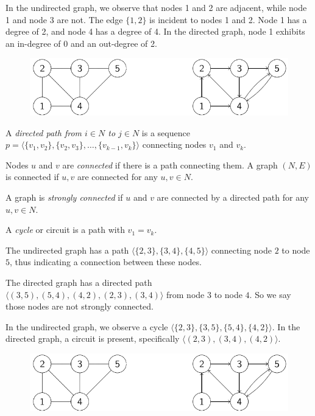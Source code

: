 \begin{example}
    In the undirected graph, we observe that nodes 1 and 2 are adjacent, while node 1 and node 3 are not. 
    The edge $\{1,2\}$ is incident to nodes 1 and 2. 
    Node 1 has a degree of 2, and node 4 has a degree of 4.
    In the directed graph, node 1 exhibits an in-degree of 0 and an out-degree of 2.
    \begin{figure}[H]
        \centering
        \includegraphics[width=0.75\linewidth]{images/graph.png}
    \end{figure}
\end{example}
\begin{definition}
    A \emph{directed path from $i \in N$ to $j \in N$} is a sequence $p=\langle \{v_1,v_2\},\{v_2,v_3\},\dots,\{v_{k-1},v_k\}\rangle $ connecting nodes $v_1$ and $v_k$.

    Nodes $u$ and $v$ are \emph{connected} if there is a path connecting them. 
    A graph $(N,E)$ is connected if $u,v$ are connected for any $u,v \in N$. 
    
    A graph is \emph{strongly connected} if $u$ and $v$ are connected by a directed path for any $u,v \in N$. 
    
    A \emph{cycle} or circuit is a path with $v_1=v_k$.
\end{definition}
\begin{example}
    The undirected graph has a path $\langle \{2,3\},\{3,4\},\{4,5\}\rangle$ connecting node $2$ to node $5$, thus indicating a connection between these nodes.
    
    The directed graph has a directed path $\langle (3,5),(5,4),(4,2),(2,3),(3,4) \rangle$ from node $3$ to node $4$. So we say those nodes are not strongly connected. 
    
    In the undirected graph, we observe a cycle $\langle \{2,3\},\{3,5\},\{5,4\},\{4,2\}\rangle$. 
    In the directed graph, a circuit is present, specifically $\langle (2,3),(3,4),(4,2) \rangle$. 
    \begin{figure}[H]
        \centering
        \includegraphics[width=0.75\linewidth]{images/graph.png}
    \end{figure}
\end{example}
